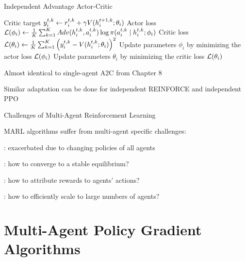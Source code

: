 \begin{frame}[t]{Independent Advantage Actor-Critic}
{\begin{minipage}{0.95\linewidth}
                                \State Critic target $y^{t,k}_i \gets r^{t,k}_i + \gamma V(h^{t+1,k}_i; \theta_i)$
                            \EndIf
                            \State Actor loss $\mathcal{L}(\phi_i) \gets \frac{1}{K} \sum_{k=1}^K Adv(h^{t,k}_i, a^{t,k}_i) \log \pi(a^{t,k}_i \mid h^{t,k}_i; \phi_i)$
                            \State Critic loss $\mathcal{L}(\theta_i) \gets \frac{1}{K} \sum_{k=1}^K \left(y^{t,k}_i - V(h^{t,k}_i; \theta_i)\right)^2$
                            \State Update parameters $\phi_i$ by minimizing the actor loss $\mathcal{L}(\phi_i)$
                            \State Update parameters $\theta_i$ by minimizing the critic loss $\mathcal{L}(\theta_i)$
                        \EndFor
                    \EndFor
            \ealg
        \end{minipage}
    }
    \hfill
    \begin{minipage}{0.38\textwidth}
        \blist
            \item<2-> Almost identical to single-agent A2C from Chapter 8
            \item<3-> Similar adaptation can be done for independent REINFORCE and independent PPO
        \elist
    \end{minipage}
\end{frame}

\begin{frame}[t]{Challenges of Multi-Agent Reinforcement Learning}
    \begin{reminderbox}
        MARL algorithms suffer from multi-agent specific challenges:
        \blist
            \item {}: exacerbated due to changing policies of all agents
            \item {}: how to converge to a stable equilibrium?
            \item {}: how to attribute rewards to agents' actions?
            \item {}: how to efficiently scale to large numbers of agents?
        \elist
    \end{reminderbox}

\end{frame}

\section{Multi-Agent Policy Gradient Algorithms}


